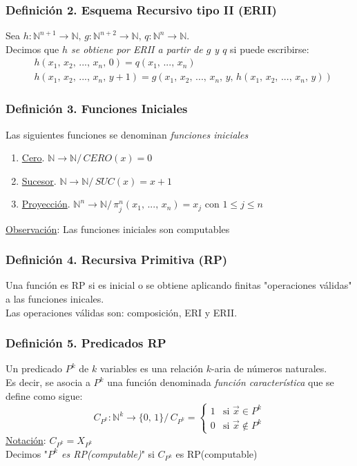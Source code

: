 \documentclass{article}
\newcommand{\comma}{,\,}                                %
\newcommand{\tq}{/\,}                                   %
\newcommand{\naturales}{\mathbb{N}}                     %
\begin{document}
\subsubsection*{Definición 2. Esquema Recursivo tipo II (ERII)}
Sea $h: \naturales^{n+1} \rightarrow \naturales \comma g: \naturales^{n+2} \rightarrow \naturales \comma q: \naturales^n \rightarrow \naturales$.
\\Decimos que \emph{$h$ se obtiene por ERII a partir de $g$ y $q$} si puede escribirse:
\begin{align*}
    &h(x_1 \comma x_2 \comma ... \comma x_n \comma 0) = q(x_1 \comma ... \comma x_n) \\
    &h(x_1 \comma x_2 \comma ... \comma x_n \comma y+1) = g(x_1 \comma x_2 \comma ... \comma x_n \comma y \comma h(x_1 \comma x_2 \comma ... \comma x_n \comma y))
\end{align*}

\subsubsection*{Definición 3. Funciones Iniciales}
Las siguientes funciones se denominan \emph{funciones iniciales}
\begin{enumerate}
    \item \underline{Cero}. $\naturales \rightarrow \naturales \tq CERO(x) = 0$
    \item \underline{Sucesor}. $\naturales \rightarrow \naturales \tq SUC(x) = x+1$
    \item \underline{Proyección}. $\naturales^n \rightarrow \naturales \tq \pi^n_j (x_1 \comma ... \comma x_n) = x_j$ con $1 \leq j \leq n$
\end{enumerate}
\underline{Observación}: Las funciones iniciales son computables

\subsubsection*{Definición 4. Recursiva Primitiva (RP)}
Una función es RP si es inicial o se obtiene aplicando finitas "operaciones válidas" a las funciones inicales.
\\Las operaciones válidas son: composición, ERI y ERII.

\subsubsection*{Definición 5. Predicados RP}
Un predicado $P^k$ de $k$ variables es una relación $k$-aria de números naturales.
\\Es decir, se asocia a $P^k$ una función denominada \emph{función característica} que se define como sigue:
\begin{equation*}
    C_{P^k}: \naturales^k \rightarrow \{ 0 \comma 1 \} \tq C_{P^k} = \begin{cases}
        1 &\text{si } \Vec{x} \in P^k \\
        0 &\text{si } \Vec{x} \notin P^k
    \end{cases}
\end{equation*}
\underline{Notación}: $C_{P^k} = X_{P^k}$
\\Decimos "\emph{$P^k$ es RP(computable)}" si $C_{P^k}$ es RP(computable)
\end{document}
